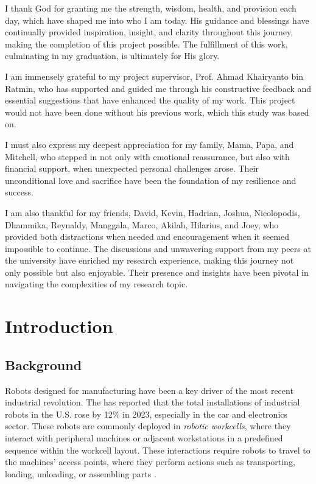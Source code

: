 \documentclass{article}
\begin{document}
I thank God for granting me the strength, wisdom, health, and provision each day, which have shaped me into who I am today. His guidance and blessings have continually provided inspiration, insight, and clarity throughout this journey, making the completion of this project possible. The fulfillment of this work, culminating in my graduation, is ultimately for His glory.

I am immensely grateful to my project supervisor, Prof. Ahmad Khairyanto bin Ratmin, who has supported and guided me through his constructive feedback and essential suggestions that have enhanced the quality of my work. This project would not have been done without his previous work, which this study was based on.

I must also express my deepest appreciation for my family, Mama, Papa, and Mitchell, who stepped in not only with emotional reassurance, but also with financial support, when unexpected personal challenges arose. Their unconditional love and sacrifice have been the foundation of my resilience and success.

I am also thankful for my friends, David, Kevin, Hadrian, Joshua, Nicolopodis, Dhammika, Reynaldy, Manggala, Marco, Akilah, Hilarius, and Joey, who provided both distractions when needed and encouragement when it seemed impossible to continue. The discussions and unwavering support from my peers at the university have enriched my research experience, making this journey not only possible but also enjoyable. Their presence and insights have been pivotal in navigating the complexities of my research topic.


\newpage
\tableofcontents
\newpage
\listoffigures
\newpage
\listoftables
\newpage
\section{Introduction}
\subsection{Background}
Robots designed for manufacturing have been a key driver of the most recent industrial revolution. The \textcite{ifr2024robots} has reported that the total installations of industrial robots in the U.S. rose by 12\% in 2023, especially in the car and electronics sector. These robots are commonly deployed in \textit{robotic workcells}, where they interact with peripheral machines or adjacent workstations in a predefined sequence within the workcell layout. These interactions require robots to travel to the machines' access points, where they perform actions such as transporting, loading, unloading, or assembling parts \parencite{standardbots2023}.
\end{document}
